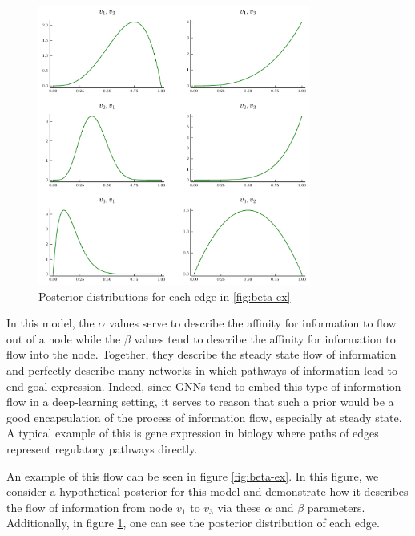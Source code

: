 \begin{figure}[t]
	\centering
	\includegraphics[width=0.8\textwidth]{images/beta_post.pdf}
	\caption{Posterior distributions for each edge in \ref{fig:beta-ex}}
	\label{fig:beta-ex-post}
\end{figure}

In this model, the $\alpha$ values serve to describe the affinity for information to flow out of a node while the $\beta$ values tend to describe the affinity for information to flow into the node. Together, they describe the steady state flow of information and perfectly describe many networks in which pathways of information lead to end-goal expression. Indeed, since GNNs tend to embed this type of information flow in a deep-learning setting, it serves to reason that such a prior would be a good encapsulation of the process of information flow, especially at steady state. A typical example of this is gene expression in biology \cite{petralia_new_2016} where paths of edges represent regulatory pathways directly. 

An example of this flow can be seen in figure \ref{fig:beta-ex}. In this figure, we consider a hypothetical posterior for this model and demonstrate how it describes the flow of information from node $v_1$ to $v_3$ via these $\alpha$ and $\beta$ parameters. Additionally, in figure \ref{fig:beta-ex-post}, one can see the posterior distribution of each edge. 

